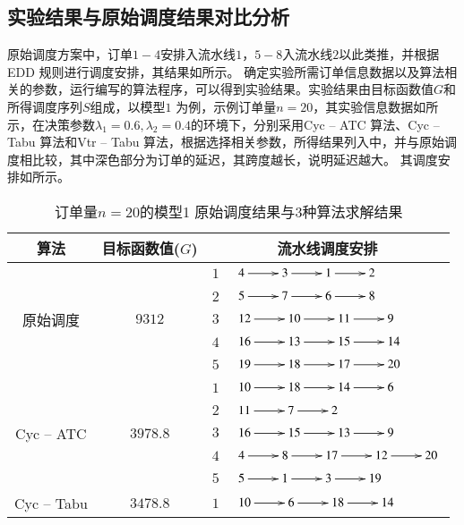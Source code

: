 \subsection{实验结果与原始调度结果对比分析}
原始调度方案中，订单$1-4$安排入流水线$1$，$5-8$入流水线$2$以此类推，并根据EDD 规则进行调度安排，其结果如所示。
确定实验所需订单信息数据以及算法相关的参数，运行编写的算法程序，可以得到实验结果。实验结果由目标函数值$G$和所得调度序列$S$组成，以模型$1$ 为例，示例订单量$n = 20$，其实验信息数据如所示，在决策参数$\lambda_1 = 0.6, \lambda_2 = 0.4$的环境下，分别采用Cyc -- ATC 算法、Cyc -- Tabu 算法和Vtr -- Tabu 算法，根据选择相关参数，所得结果列入中，并与原始调度相比较，其中深色部分为订单的延迟，其跨度越长，说明延迟越大。
其调度安排如所示。
\begin{table}[h!]
  \centering
  \label{tab:resultmodel1}\caption{订单量$n = 20$的模型1 原始调度结果与$3$种算法求解结果}
    \begin{tabular}{cccl}
    \toprule
    算法    & 目标函数值($G$) & \multicolumn{2}{c}{流水线调度安排} \\
    \midrule
    \multirow{5}[2]{*}{原始调度} & \multirow{5}[2]{*}{$9312$} & $1$
        &  $\xymatrix{4 \ar[r] & 3 \ar[r] & 1 \ar[r] & 2}$\\
         &        & $2$     &  $\xymatrix{5 \ar[r] & 7 \ar[r]& 6 \ar [r]& 8}$\\
         &        & $3$     &  $\xymatrix{12 \ar[r] & 10 \ar[r] & 11 \ar[r] & 9}$\\
         &        & $4$     &  $\xymatrix{16 \ar[r] & 13 \ar[r]& 15 \ar[r] & 14}$\\
         &        & $5$     &  $\xymatrix{19 \ar[r] &18 \ar[r] & 17 \ar[r] &20}$\\
      \hline
    \multirow{5}[2]{*}{Cyc -- ATC} & \multirow{5}[2]{*}{$3978.8$} & $1$     &$\xymatrix{10 \ar[r] & 18 \ar[r] & 14 \ar[r] & 6}$\\
          &       & $2$     &  $\xymatrix{11 \ar[r] & 7 \ar[r] & 2}$\\
          &       & $3$     &  $\xymatrix{16 \ar[r] & 15 \ar[r] & 13 \ar[r] & 9}$\\
          &       & $4$     &  $\xymatrix{4 \ar[r] & 8 \ar[r] & 17 \ar[r] & 12 \ar[r]&20}$\\
          &       & $5$     &  $\xymatrix{5 \ar[r] & 1 \ar[r] & 3 \ar[r] & 19}$\\
     \hline
    \multirow{5}[2]{*}{Cyc -- Tabu} & \multirow{5}[2]{*}{$3478.8$} & $1$     &  $\xymatrix{10 \ar[r] & 6 \ar[r] & 18 \ar[r] & 14}$\\

\end{tabular}
\end{table}
